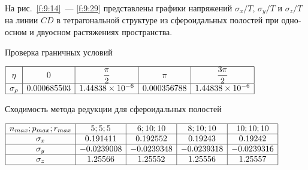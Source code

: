 \begin{russian}
На рис.~\ref{f:9:14}~--- \ref{f:9:29} представлены графики напряжений $\sigma_x/T$, $\sigma_y/T$ и $\sigma_z/T$ на линии $CD$ в тетрагональной структуре из сфероидальных полостей при одноосном и двуосном растяжениях пространства.

%

\begin{table}[h]
\caption{Проверка граничных условий}
\centering
$
\begin{array}{|c|c|c|c|c|}
\hline
\eta & 0 & \dfrac{\pi}{2} & \pi & \dfrac{3\pi}{2} \\
\hline
\sigma_\rho & 0.000685503 & 1.44838\times 10^{-6} & 0.000356788 & 1.44838\times 10^{-6} \\
\hline
\end{array}
$
\label{t:9:1}
\end{table}

\begin{table}[h]
\caption{Сходимость метода редукции для сфероидальных полостей}
\centering
$
\begin{array}{|c|c|c|c|c|}
\hline
n_{max}; p_{max}; r_{max} & 5; 5; 5 & 6; 10; 10 & 8; 10; 10 & 10; 10; 10 \\
\hline
\sigma_x & 0.191411		& 0.192552 	& 0.19243 		& 0.19242 \\
\hline
\sigma_y & -0.0239008 	& -0.0239348 	& -0.0239318 	& -0.0239316 \\
\hline
\sigma_z & 1.25566 		& 1.25552 		& 1.25556 		& 1.25557 \\
\hline
\end{array}
$
\label{t:9:2}
\end{table}


\end{russian}
